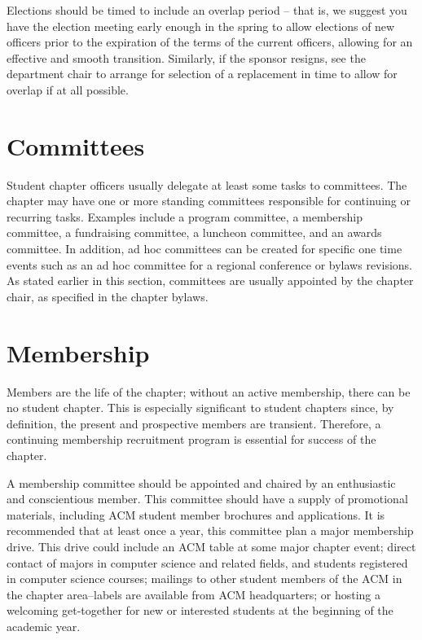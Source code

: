 Elections should be timed to include an overlap period -- that is, we suggest you have the election meeting early enough in the spring to allow elections of new officers prior to the expiration of the terms of the current officers, allowing for an effective and smooth transition. Similarly, if the sponsor resigns, see the department chair to arrange for selection of a replacement in time to allow for overlap if at all possible.

\section{Committees}

Student chapter officers usually delegate at least some tasks to committees. The chapter may have one or more standing committees responsible for continuing or recurring tasks. Examples include a program committee, a membership committee, a fundraising committee, a luncheon committee, and an awards committee. In addition, ad hoc committees can be created for specific one time events such as an ad hoc committee for a regional conference or bylaws revisions. As stated earlier in this section, committees are usually appointed by the chapter chair, as specified in the chapter bylaws.

\section{Membership}

Members are the life of the chapter; without an active membership, there can be no student chapter. This is especially significant to student chapters since, by definition, the present and prospective members are transient. Therefore, a continuing membership recruitment program is essential for success of the chapter.

A membership committee should be appointed and chaired by an enthusiastic and conscientious member. This committee should have a supply of promotional materials, including ACM student member brochures and applications. It is recommended that at least once a year, this committee plan a major membership drive. This drive could include an ACM table at some major chapter event; direct contact of majors in computer science and related fields, and students registered in computer science courses; mailings to other student members of the ACM in the chapter area--labels are available from ACM headquarters; or hosting a welcoming get-together for new or interested students at the beginning of the academic year.

